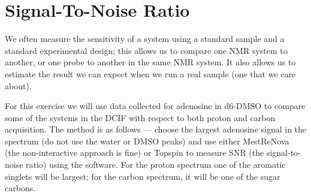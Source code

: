 \documentclass[../psets.tex]{subfiles}
\begin{document}
\section{Signal-To-Noise Ratio}
We often measure the sensitivity of a system using a standard sample and a standard experimental design; this allows us to compare one NMR system to another, or one probe to another in the same NMR system. It also allows us to estimate the result we can expect when we run a real sample (one that we care about).\par
For this exercise we will use data collected for adenosine in d6-DMSO to compare some of the systems in the DCIF with respect to both proton and carbon acquisition. The method is as follows --- choose the largest adenosine signal in the spectrum (do not use the water or DMSO peaks) and use either MestReNova (the non-interactive approach is fine) or Topspin to measure SNR (the signal-to-noise ratio) using the software. For the proton spectrum one of the aromatic singlets will be largest; for the carbon spectrum, it will be one of the sugar carbons.
\end{document}
